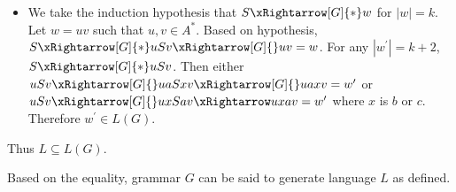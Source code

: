 \begin{enumerate}
\begin{itemize}[label={}]
		\item
		We take the induction hypothesis that $S\xRightarrow[G]{*}w$ for $|w| = k$.
		Let $w = uv$ such that $u,v \in A^*$.
		Based on hypothesis, $S \xRightarrow[G]{*} uSv \xRightarrow[G]{} uv = w$.
		For any $|w^\prime| = k + 2$, $S \xRightarrow[G]{*} uSv$.
		Then either $uSv \xRightarrow[G]{} uaSxv \xRightarrow[G]{} uaxv = w^\prime$ or $uSv \xRightarrow[G]{} uxSav \xRightarrow uxav = w^\prime$ where $x$ is $b$ or $c$.
		Therefore $w^\prime \in L(G)$.

	\end{itemize}

	Thus $L \subseteq L(G)$.

\end{enumerate}

Based on the equality, grammar $G$ can be said to generate language $L$ as defined.
